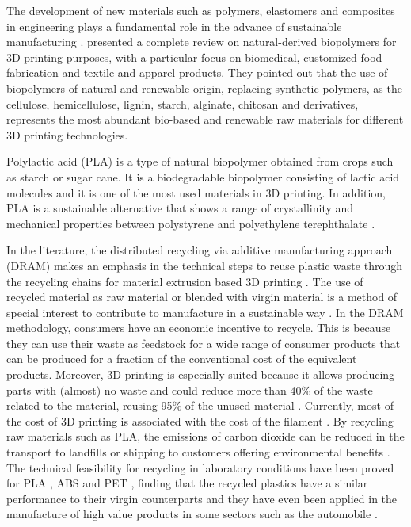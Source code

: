 \documentclass[]{interact}
\theoremstyle{plain}%
\theoremstyle{definition}
\theoremstyle{remark}
\begin{document}
The development of new materials such as polymers, elastomers and
composites in engineering plays a fundamental role in the advance of
sustainable manufacturing \citep{Ashby2013}. \citet{Liu2019a} presented
a complete review on natural-derived biopolymers for 3D printing
purposes, with a particular focus on biomedical, customized food
fabrication and textile and apparel products. They pointed out that the
use of biopolymers of natural and renewable origin, replacing synthetic
polymers, as the cellulose, hemicellulose, lignin, starch, alginate,
chitosan and derivatives, represents the most abundant bio-based and
renewable raw materials for different 3D printing technologies.

Polylactic acid (PLA) is a type of natural biopolymer obtained from
crops such as starch or sugar cane. It is a biodegradable biopolymer
consisting of lactic acid molecules and it is one of the most used
materials in 3D printing. In addition, PLA is a sustainable alternative
that shows a range of crystallinity and mechanical properties between
polystyrene and polyethylene terephthalate
\citep{Kumar2018b, Zhao2018a}.

In the literature, the distributed recycling via additive manufacturing
approach (DRAM) makes an emphasis in the technical steps to reuse
plastic waste through the recycling chains for material extrusion based
3D printing \citep{CruzSanchez2020, Little2020}. The use of recycled
material as raw material or blended with virgin material is a method of
special interest to contribute to manufacture in a sustainable way
\citep{Zhao2018}. In the DRAM methodology, consumers have an economic
incentive to recycle. This is because they can use their waste as
feedstock for a wide range of consumer products that can be produced for
a fraction of the conventional cost of the equivalent products.
Moreover, 3D printing is especially suited because it allows producing
parts with (almost) no waste and could reduce more than 40\% of the
waste related to the material, reusing 95\% of the unused material
\citep{Petrovic2011}. Currently, most of the cost of 3D printing is
associated with the cost of the filament \citep{Wittbrodt2013}. By
recycling raw materials such as PLA, the emissions of carbon dioxide can
be reduced in the transport to landfills or shipping to customers
offering environmental benefits \citep{Santander2020}. The technical
feasibility for recycling in laboratory conditions have been proved for
PLA \citep{CruzSanchez2017}, ABS \citep{Vidakis2020} and PET
\citep{Zander2018}, finding that the recycled plastics have a similar
performance to their virgin counterparts and they have even been applied
in the manufacture of high value products in some sectors such as the
automobile \citep{Zhao2018}.
\end{document}
